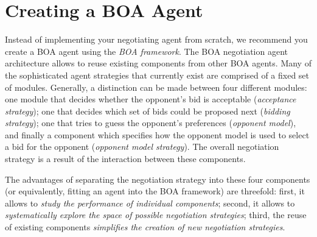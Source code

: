 \documentclass[]{article}
\begin{document}
\section{Creating a BOA Agent}\label{sec:boa}
Instead of implementing your negotiating agent from scratch, we recommend you create a BOA agent using the \textit{BOA framework}. The BOA negotiation agent architecture allows to reuse existing components from other BOA agents. Many of the sophisticated agent strategies that currently exist are comprised of a fixed set of modules. Generally, a distinction can be made between four different modules: one module that decides whether the opponent's bid is acceptable (\textit{acceptance strategy}); one that decides which set of bids could be proposed next (\textit{bidding strategy}); one that tries to guess the opponent's preferences (\textit{opponent model}), and finally a component which specifies how the opponent model is used to select a bid for the opponent (\textit{opponent model strategy}). The overall negotiation strategy is a result of the interaction between these components.

The advantages of separating the negotiation strategy into these four components (or equivalently, fitting an agent into the BOA framework) are threefold: first, it allows to \textit{study the performance of individual components}; second, it allows to \textit{systematically explore the space of possible negotiation strategies}; third, the reuse of existing components \textit{simplifies the creation of new negotiation strategies}.
\end{document}
